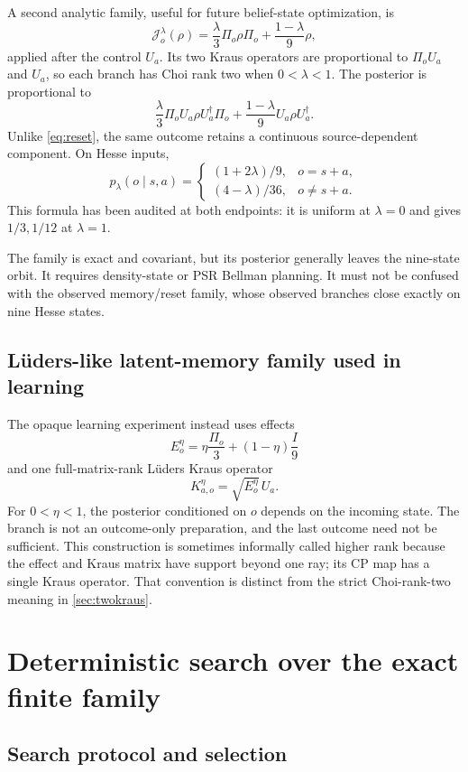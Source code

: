 \documentclass[11pt]{article}
\theoremstyle{definition}
\theoremstyle{remark}
\newcommand{\cJ}{\mathcal J}
\begin{document}
A second analytic family, useful for future belief-state optimization, is
\begin{equation}
\cJ_o^\lambda(\rho)=
\frac{\lambda}{3}\Pi_o\rho\Pi_o+
\frac{1-\lambda}{9}\rho,
\label{eq:twokraus}
\end{equation}
applied after the control \(U_a\). Its two Kraus operators are proportional to
\(\Pi_oU_a\) and \(U_a\), so each branch has Choi rank two when
\(0<\lambda<1\). The posterior is proportional to
\[
\frac{\lambda}{3}\Pi_oU_a\rho U_a^\dagger\Pi_o+
\frac{1-\lambda}{9}U_a\rho U_a^\dagger.
\]
Unlike \cref{eq:reset}, the same outcome retains a continuous
source-dependent component. On Hesse inputs,
\[
p_\lambda(o\mid s,a)=
\begin{cases}
(1+2\lambda)/9,&o=s+a,\\
(4-\lambda)/36,&o\ne s+a.
\end{cases}
\]
This formula has been audited at both endpoints: it is uniform at
\(\lambda=0\) and gives \(1/3,1/12\) at \(\lambda=1\).

The family is exact and covariant, but its posterior generally leaves the
nine-state orbit. It requires density-state or PSR Bellman planning. It must
not be confused with the observed memory/reset family, whose observed
branches close exactly on nine Hesse states.

\subsection{Lüders-like latent-memory family used in learning}
\label{sec:luders}

The opaque learning experiment instead uses effects
\[
E_o^\eta=\eta\frac{\Pi_o}{3}+(1-\eta)\frac I9
\]
and one full-matrix-rank Lüders Kraus operator
\[
K_{a,o}^\eta=\sqrt{E_o^\eta}\,U_a.
\]
For \(0<\eta<1\), the posterior conditioned on \(o\) depends on the incoming
state. The branch is not an outcome-only preparation, and the last outcome
need not be sufficient. This construction is sometimes informally called
higher rank because the effect and Kraus matrix have support beyond one ray;
its CP map has a single Kraus operator. That convention is distinct from the
strict Choi-rank-two meaning in \cref{sec:twokraus}.

\section{Deterministic search over the exact finite family}

\subsection{Search protocol and selection}
\end{document}
